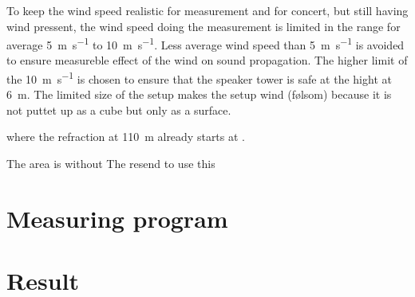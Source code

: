 To keep the wind speed realistic for measurement and for concert, but still having wind pressent, the wind speed doing the measurement is limited in the range for average \SI{5}{\meter\per\second} to \SI{10}{\meter\per\second}. Less average wind speed than \SI{5}{\meter\per\second} is avoided to ensure measureble effect of the wind on sound propagation. The higher limit of the \SI{10}{\meter\per\second} is chosen to ensure that the speaker tower is safe at the hight at \SI{6}{\meter}. The limited size of the setup makes the setup wind (følsom) because it is not puttet up as a cube but only as a surface. 




where the refraction at \SI{110}{\meter} already starts at . 


The area is without  The resend to use this  




\section{Measuring program}


\section{Result}

